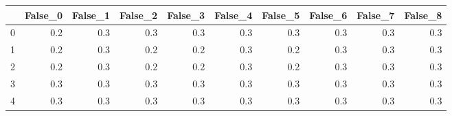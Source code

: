 \begin{tabular}{lrrrrrrrrr}
\toprule
{} &  False\_0 &  False\_1 &  False\_2 &  False\_3 &  False\_4 &  False\_5 &  False\_6 &  False\_7 &  False\_8 \\ \hline
\midrule
0 &      0.2 &      0.3 &      0.3 &      0.3 &      0.3 &      0.3 &      0.3 &      0.3 &      0.3 \\ \hline
1 &      0.2 &      0.3 &      0.2 &      0.2 &      0.3 &      0.2 &      0.3 &      0.3 &      0.3 \\ \hline
2 &      0.2 &      0.3 &      0.2 &      0.2 &      0.3 &      0.2 &      0.3 &      0.3 &      0.3 \\ \hline
3 &      0.3 &      0.3 &      0.3 &      0.3 &      0.3 &      0.3 &      0.3 &      0.3 &      0.3 \\ \hline
4 &      0.3 &      0.3 &      0.3 &      0.3 &      0.3 &      0.3 &      0.3 &      0.3 &      0.3 \\ \hline
\bottomrule
\end{tabular}
